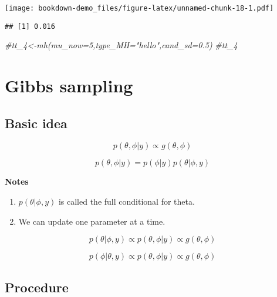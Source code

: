 \documentclass[
]{book}
\newenvironment{Shaded}{\begin{snugshade}}{\end{snugshade}}
\newcommand{\CommentTok}[1]{\textcolor[rgb]{0.56,0.35,0.01}{\textit{#1}}}
\newcommand{\DecValTok}[1]{\textcolor[rgb]{0.00,0.00,0.81}{#1}}
\newcommand{\NormalTok}[1]{#1}
\newcommand{\OperatorTok}[1]{\textcolor[rgb]{0.81,0.36,0.00}{\textbf{#1}}}
\begin{document}
\texttt{[image: bookdown-demo\_files/figure-latex/unnamed-chunk-18-1.pdf]}

\begin{Shaded}
\end{Shaded}

\begin{verbatim}
## [1] 0.016
\end{verbatim}

\begin{Shaded}
\begin{Highlighting}[]
\CommentTok{#tt_4<-mh(mu_now=5,type_MH="hello",cand_sd=0.5)}
\CommentTok{#tt_4}
\end{Highlighting}
\end{Shaded}

\hypertarget{gibbs-sampling}{%
\section{Gibbs sampling}\label{gibbs-sampling}}

\hypertarget{basic-idea}{%
\subsection{Basic idea}\label{basic-idea}}

\[p(\theta, \phi|y) \propto g(\theta, \phi)\]

\[p(\theta, \phi|y) = p(\phi |y)p(\theta| \phi,y)\]

\textbf{Notes}

\begin{enumerate}
\def\labelenumi{(\arabic{enumi})}
\item
  \(p(\theta| \phi,y)\) is called the full conditional for theta.
\item
  We can update one parameter at a time.
\end{enumerate}

\[p(\theta| \phi,y) \propto p(\theta, \phi|y) \propto g(\theta, \phi)\]

\[p(\phi| \theta,y) \propto p(\theta, \phi|y) \propto g(\theta, \phi)\]

\hypertarget{procedure-1}{%
\subsection{Procedure}\label{procedure-1}}
\end{document}
